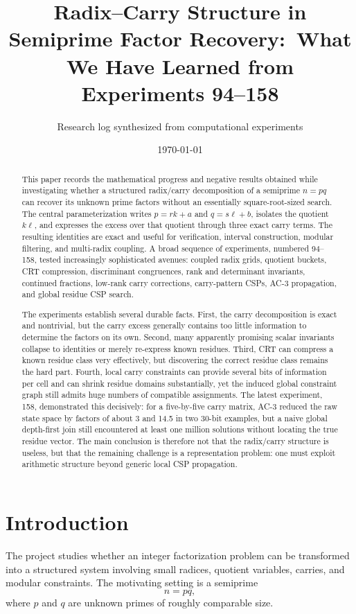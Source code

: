 \documentclass[11pt,a4paper]{article}
\title{\textbf{Radix--Carry Structure in Semiprime Factor Recovery:}\
What We Have Learned from Experiments 94--158}
\author{Research log synthesized from computational experiments}
\date{\today}
\begin{document}
\maketitle

\begin{abstract}
This paper records the mathematical progress and negative results obtained while investigating whether a structured radix/carry decomposition of a semiprime
\(n=pq\) can recover its unknown prime factors without an essentially square-root-sized search. The central parameterization writes
\(p=rk+a\) and \(q=s\ell+b\), isolates the quotient \(k\ell\), and expresses the excess over that quotient through three exact carry terms. The resulting identities are exact and useful for verification, interval construction, modular filtering, and multi-radix coupling. A broad sequence of experiments, numbered 94--158, tested increasingly sophisticated avenues: coupled radix grids, quotient buckets, CRT compression, discriminant congruences, rank and determinant invariants, continued fractions, low-rank carry corrections, carry-pattern CSPs, AC-3 propagation, and global residue CSP search.

The experiments establish several durable facts. First, the carry decomposition is exact and nontrivial, but the carry excess generally contains too little information to determine the factors on its own. Second, many apparently promising scalar invariants collapse to identities or merely re-express known residues. Third, CRT can compress a known residue class very effectively, but discovering the correct residue class remains the hard part. Fourth, local carry constraints can provide several bits of information per cell and can shrink residue domains substantially, yet the induced global constraint graph still admits huge numbers of compatible assignments. The latest experiment, 158, demonstrated this decisively: for a five-by-five carry matrix, AC-3 reduced the raw state space by factors of about 3 and 14.5 in two 30-bit examples, but a naive global depth-first join still encountered at least one million solutions without locating the true residue vector. The main conclusion is therefore not that the radix/carry structure is useless, but that the remaining challenge is a representation problem: one must exploit arithmetic structure beyond generic local CSP propagation.
\end{abstract}

\tableofcontents
\newpage

\section{Introduction}
The project studies whether an integer factorization problem can be transformed into a structured system involving small radices, quotient variables, carries, and modular constraints. The motivating setting is a semiprime
\[
    n=pq,
\]
where \(p\) and \(q\) are unknown primes of roughly comparable size.
\end{document}
